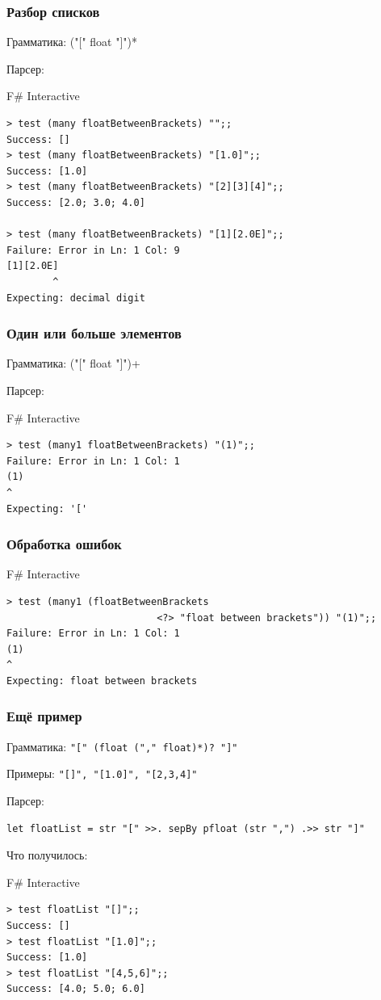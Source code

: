 \documentclass[xetex,mathserif,serif]{beamer}
\begin{document}
    \begin{frame}[fragile]
        \frametitle{Разбор списков}
        Грамматика: ("[" float "]")*

        Парсер:
        \begin{alertblock}{F\# Interactive}
            \begin{verbatim}
> test (many floatBetweenBrackets) "";;
Success: []
> test (many floatBetweenBrackets) "[1.0]";;
Success: [1.0]
> test (many floatBetweenBrackets) "[2][3][4]";;
Success: [2.0; 3.0; 4.0]

> test (many floatBetweenBrackets) "[1][2.0E]";;
Failure: Error in Ln: 1 Col: 9
[1][2.0E]
        ^
Expecting: decimal digit
            \end{verbatim}
        \end{alertblock}
    \end{frame}

    \begin{frame}[fragile]
        \frametitle{Один или больше элементов}
        Грамматика: ("[" float "]")+

        Парсер:
        \begin{alertblock}{F\# Interactive}
            \begin{verbatim}
> test (many1 floatBetweenBrackets) "(1)";;
Failure: Error in Ln: 1 Col: 1
(1)
^
Expecting: '['
            \end{verbatim}
        \end{alertblock}
    \end{frame}

    \begin{frame}[fragile]
        \frametitle{Обработка ошибок}
        \begin{alertblock}{F\# Interactive}
            \begin{verbatim}
> test (many1 (floatBetweenBrackets 
                          <?> "float between brackets")) "(1)";;
Failure: Error in Ln: 1 Col: 1
(1)
^
Expecting: float between brackets
            \end{verbatim}
        \end{alertblock}
    \end{frame}

    \begin{frame}[fragile]
        \frametitle{Ещё пример}
        Грамматика: \verb|"[" (float ("," float)*)? "]"|
        
        Примеры: \verb|"[]", "[1.0]", "[2,3,4]"|

        Парсер:
        \begin{verbatim}
let floatList = str "[" >>. sepBy pfloat (str ",") .>> str "]"
        \end{verbatim}

        Что получилось:
        \begin{alertblock}{F\# Interactive}
            \begin{verbatim}
> test floatList "[]";;
Success: []
> test floatList "[1.0]";;
Success: [1.0]
> test floatList "[4,5,6]";;
Success: [4.0; 5.0; 6.0]
            \end{verbatim}
        \end{alertblock}
    \end{frame}
\end{document}
